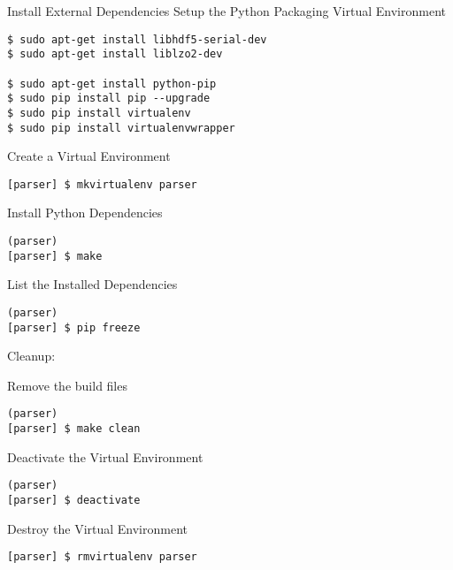 Install External Dependencies
Setup the Python Packaging Virtual Environment

\begin{lstlisting}
$ sudo apt-get install libhdf5-serial-dev
$ sudo apt-get install liblzo2-dev

$ sudo apt-get install python-pip
$ sudo pip install pip --upgrade
$ sudo pip install virtualenv
$ sudo pip install virtualenvwrapper
\end{lstlisting}

Create a Virtual Environment

\begin{lstlisting}
[parser] $ mkvirtualenv parser
\end{lstlisting}

Install Python Dependencies

\begin{lstlisting}
(parser)
[parser] $ make
\end{lstlisting}

List the Installed Dependencies

\begin{lstlisting}
(parser)
[parser] $ pip freeze
\end{lstlisting}

Cleanup:

Remove the build files

\begin{lstlisting}
(parser)
[parser] $ make clean
\end{lstlisting}

Deactivate the Virtual Environment

\begin{lstlisting}
(parser)
[parser] $ deactivate
\end{lstlisting}

Destroy the Virtual Environment

\begin{lstlisting}
[parser] $ rmvirtualenv parser  
\end{lstlisting}

